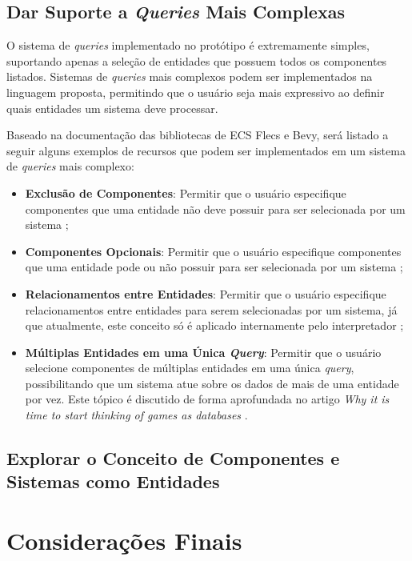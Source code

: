 \subsection{Dar Suporte a \textit{Queries} Mais Complexas}

O sistema de \textit{queries} implementado no protótipo é extremamente simples, suportando apenas a seleção de entidades que possuem todos os componentes listados. Sistemas de \textit{queries} mais complexos podem ser implementados na linguagem proposta, permitindo que o usuário seja mais expressivo ao definir quais entidades um sistema deve processar.

Baseado na documentação das bibliotecas de ECS Flecs e Bevy, será listado a seguir alguns exemplos de recursos que podem ser implementados em um sistema de \textit{queries} mais complexo:

\begin{itemize}
    \item \textbf{Exclusão de Componentes}: Permitir que o usuário especifique componentes que uma entidade não deve possuir para ser selecionada por um sistema \cite{flecs, bevy};
    \item \textbf{Componentes Opcionais}: Permitir que o usuário especifique componentes que uma entidade pode ou não possuir para ser selecionada por um sistema \cite{flecs, bevy};
    \item \textbf{Relacionamentos entre Entidades}: Permitir que o usuário especifique relacionamentos entre entidades para serem selecionadas por um sistema, já que atualmente, este conceito só é aplicado internamente pelo interpretador \cite{flecs, bevy};
    \item \textbf{Múltiplas Entidades em uma Única \textit{Query}}: Permitir que o usuário selecione componentes de múltiplas entidades em uma única \textit{query}, possibilitando que um sistema atue sobre os dados de mais de uma entidade por vez. Este tópico é discutido de forma aprofundada no artigo \textit{Why it is time to start thinking of games as databases} \cite{ecsstorageinpics}.
\end{itemize}

\subsection{Explorar o Conceito de Componentes e Sistemas como Entidades}

\section{Considerações Finais}
